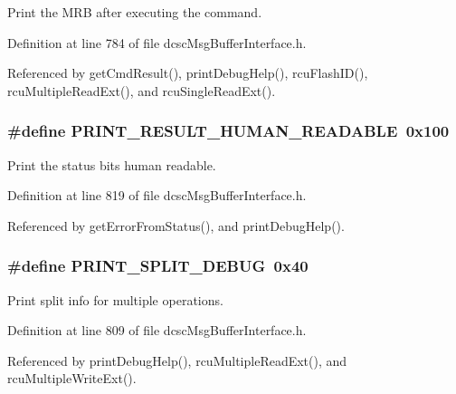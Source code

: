 Print the MRB after executing the command. 



Definition at line 784 of file dcsc\-Msg\-Buffer\-Interface.h.

Referenced by get\-Cmd\-Result(), print\-Debug\-Help(), rcu\-Flash\-ID(), rcu\-Multiple\-Read\-Ext(), and rcu\-Single\-Read\-Ext().\hypertarget{group__dcsc__msg__buffer__access_g5d966eba98a480141a4145615ca3ea15}{
\subsubsection[PRINT\_\-RESULT\_\-HUMAN\_\-READABLE]{\setlength{\rightskip}{0pt plus 5cm}\#define PRINT\_\-RESULT\_\-HUMAN\_\-READABLE~0x100}}
\label{group__dcsc__msg__buffer__access_g5d966eba98a480141a4145615ca3ea15}


Print the status bits human readable. 



Definition at line 819 of file dcsc\-Msg\-Buffer\-Interface.h.

Referenced by get\-Error\-From\-Status(), and print\-Debug\-Help().\hypertarget{group__dcsc__msg__buffer__access_g36c838823c9602c6a0f6efd1fe135b18}{
\subsubsection[PRINT\_\-SPLIT\_\-DEBUG]{\setlength{\rightskip}{0pt plus 5cm}\#define PRINT\_\-SPLIT\_\-DEBUG~0x40}}
\label{group__dcsc__msg__buffer__access_g36c838823c9602c6a0f6efd1fe135b18}


Print split info for multiple operations. 



Definition at line 809 of file dcsc\-Msg\-Buffer\-Interface.h.

Referenced by print\-Debug\-Help(), rcu\-Multiple\-Read\-Ext(), and rcu\-Multiple\-Write\-Ext().

